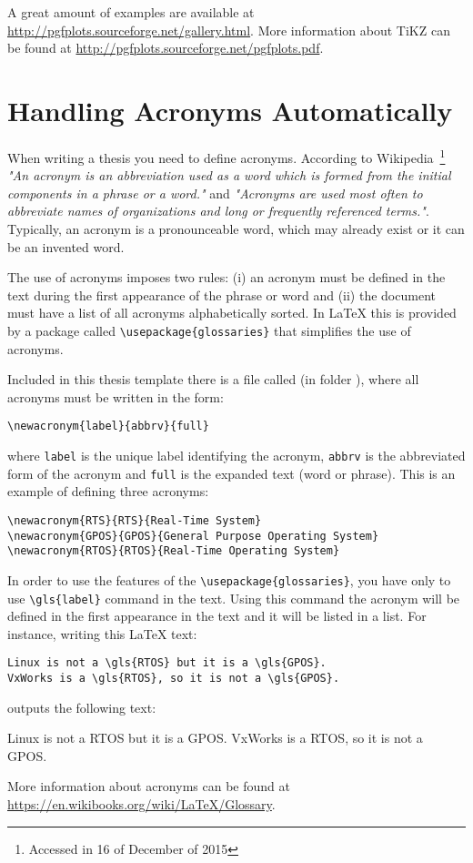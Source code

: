 A great amount of examples are available at \url{http://pgfplots.sourceforge.net/gallery.html}. 
More information about TiKZ can be found at 
\url{http://pgfplots.sourceforge.net/pgfplots.pdf}.


\section{Handling Acronyms Automatically}
When writing a thesis you need to define acronyms.
According to Wikipedia~\footnote{Accessed in 16 of December of 2015} \textit{"An acronym is an abbreviation used as a word which is formed from the initial components in a phrase or a word."} and
\textit{"Acronyms are used most often to abbreviate names of organizations and long or frequently referenced terms."}.
Typically, an acronym is a pronounceable word, which may already exist or it can be an invented word. 

The use of acronyms imposes two rules: (i) an acronym must be defined in the text during the first appearance of the phrase or word and (ii) the document must have a list of all acronyms alphabetically sorted. In \LaTeX{} this is provided by a package called \verb|\usepackage{glossaries}| that simplifies the use of acronyms. 

Included in this thesis template there is a file called  (in folder ), where all acronyms must be written in the form:
\begin{verbatim}
\newacronym{label}{abbrv}{full}
\end{verbatim}
where \verb|label| is the unique label identifying the acronym, \verb|abbrv| is the abbreviated form of the acronym and \verb|full| is the expanded text (word or phrase). This is an example of defining three acronyms:
\begin{verbatim}
\newacronym{RTS}{RTS}{Real-Time System}
\newacronym{GPOS}{GPOS}{General Purpose Operating System}
\newacronym{RTOS}{RTOS}{Real-Time Operating System}
\end{verbatim}

In order to use the features of the \verb|\usepackage{glossaries}|, you have only to use \verb|\gls{label}| command in the text. 
Using this command the acronym will be defined in the first appearance in the text and it will be listed in a list.
For instance, writing this \LaTeX{} text:
\begin{verbatim}
Linux is not a \gls{RTOS} but it is a \gls{GPOS}. 
VxWorks is a \gls{RTOS}, so it is not a \gls{GPOS}.
\end{verbatim}

outputs the following text: 

Linux is not a \gls{RTOS} but it is a \gls{GPOS}. VxWorks is a \gls{RTOS}, so it is not a \gls{GPOS}.

More information about acronyms can be found at 
\url{https://en.wikibooks.org/wiki/LaTeX/Glossary}.
